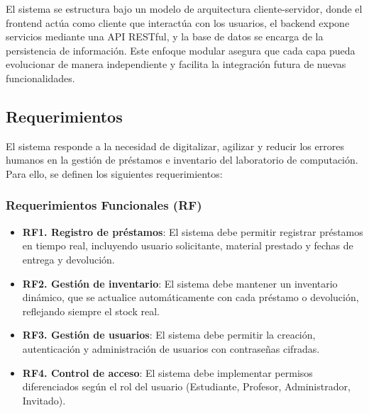 El sistema se estructura bajo un modelo de arquitectura cliente-servidor, donde el frontend 
actúa como cliente que interactúa con los usuarios, el backend expone servicios mediante una 
API RESTful, y la base de datos se encarga de la persistencia de información. Este enfoque 
modular asegura que cada capa pueda evolucionar de manera independiente y facilita la 
integración futura de nuevas funcionalidades.

\subsection{Requerimientos}

El sistema responde a la necesidad de digitalizar, agilizar y reducir los errores humanos en 
la gestión de préstamos e inventario del laboratorio de computación. Para ello, se definen 
los siguientes requerimientos:

\subsubsection*{Requerimientos Funcionales (RF)}
\begin{itemize}
	\item \textbf{RF1. Registro de préstamos}: El sistema debe permitir registrar préstamos 
	en tiempo real, incluyendo usuario solicitante, material prestado y fechas de entrega y 
	devolución.
	\item \textbf{RF2. Gestión de inventario}: El sistema debe mantener un inventario 
	dinámico, que se actualice automáticamente con cada préstamo o devolución, reflejando 
	siempre el stock real.
	\item \textbf{RF3. Gestión de usuarios}: El sistema debe permitir la creación, 
	autenticación y administración de usuarios con contraseñas cifradas.
	\item \textbf{RF4. Control de acceso}: El sistema debe implementar permisos diferenciados 
	según el rol del usuario (Estudiante, Profesor, Administrador, Invitado).
\end{itemize}

